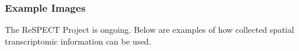 \documentclass[pdflatex]{beamer}
\begin{document}
\begin{frame}
 \frametitle{Example Images}
 The ReSPECT Project is ongoing. Below are examples of how collected spatial transcriptomic information can be used.


\providecommand{\figName}{LowCallOut}
\providecommand{\figFile}{\figName}
\hypertarget{\figFile}{}
 
\end{frame}


\def\newblock{\hskip .11em plus .33em minus .07em}






\end{document}
